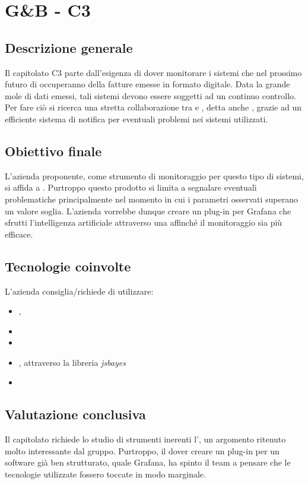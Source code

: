 \section{G\&B - C3} \label{c3}
    \subsection{Descrizione generale}
    Il capitolato C3 parte dall'esigenza di dover monitorare i sistemi che nel prossimo futuro di occuperanno della fatture emesse in formato digitale.
    Data la grande mole di dati emessi, tali sistemi devono essere soggetti ad un continuo controllo. Per fare ciò si ricerca una stretta collaborazione
    tra  e , detta anche , grazie ad un efficiente sistema di notifica per eventuali problemi nei sistemi utilizzati.

    \subsection{Obiettivo finale}
    L'azienda proponente, come strumento di monitoraggio per questo tipo di sistemi, si affida a . Purtroppo questo prodotto si limita a
    segnalare eventuali problematiche principalmente nel momento in cui i parametri osservati superano un valore soglia. L'azienda vorrebbe dunque creare un plug-in
    per Grafana che sfrutti l'intelligenza artificiale attraverso una  affinché il monitoraggio sia più efficace.

    \subsection{Tecnologie coinvolte}
    L'azienda consiglia/richiede di utilizzare:
    \begin{itemize}
    	\item {}, 
    	\item {}
    	\item {}
    	\item {}, attraverso la libreria \textit{jsbayes}
    	\item {}
    \end{itemize}

    \subsection{Valutazione conclusiva}
    Il capitolato richiede lo studio di strumenti inerenti l', un argomento ritenuto molto interessante dal gruppo.
    Purtroppo, il dover creare un plug-in per un software già ben strutturato, quale Grafana, ha spinto il team a pensare che le tecnologie utilizzate fossero
    toccate in modo marginale.

